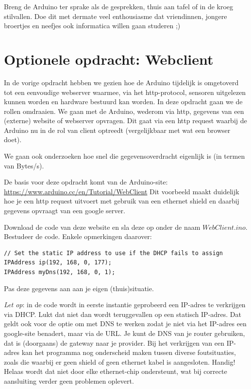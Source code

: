 \begin{exercise}
Breng de Arduino ter sprake als de gesprekken, thuis aan tafel of in de kroeg stilvallen. Doe dit met dermate veel enthousiasme dat vriendinnen, jongere broertjes en neefjes ook informatica willen gaan studeren ;)
\end{exercise}

\newpage

\section{Optionele opdracht: Webclient}
In de vorige opdracht hebben we gezien hoe de Arduino tijdelijk is omgetoverd tot een eenvoudige webserver waarmee, via het http-protocol, sensoren uitgelezen kunnen worden en hardware bestuurd kan worden. In deze opdracht gaan we de rollen omdraaien. We gaan met de Arduino, wederom via http, gegevens van een (externe) website of webserver opvragen. Dit gaat via een http request waarbij de Arduino nu in de rol van client optreedt (vergelijkbaar met wat een browser doet). \par 
We gaan ook onderzoeken hoe snel die gegevensoverdracht eigenlijk is (in termen van Bytes/s). \newline \newline

De basis voor deze opdracht komt van de Arduino-site: \newline
\url{https://www.arduino.cc/en/Tutorial/WebClient} \newline
Dit voorbeeld maakt duidelijk hoe je een http request uitvoert met gebruik van een ethernet shield en daarbij gegevens opvraagt van een google server. \newline \newline

\begin{exercise}
Download de code van deze website en sla deze op onder de naam $WebClient.ino$. Bestudeer de code. Enkele opmerkingen daarover:
\begin{lstlisting}[language=Arduino, numbers=none]
// Set the static IP address to use if the DHCP fails to assign
IPAddress ip(192, 168, 0, 177);
IPAddress myDns(192, 168, 0, 1);
\end{lstlisting}

Pas deze gegevens aan aan je eigen (thuis)situatie.
\end{exercise}

\begin{remark}\textit{Let op}: in de code wordt in eerste instantie geprobeerd een IP-adres te verkrijgen via DHCP. Lukt dat niet dan wordt teruggevallen op een statisch IP-adres. Dat geldt ook voor de optie om met DNS te werken zodat je niet via het IP-adres een google-site benadert, maar via de URL. Je kunt de DNS van je router gebruiken, dat is (doorgaans) de gateway naar je provider. Bij het verkrijgen van een IP-adres kan het programma nog onderscheid maken tussen diverse foutsituaties, zoals die waarbij er geen shield of geen ethernet kabel is aangesloten. Handig! Helaas wordt dat niet door elke ethernet-chip ondersteunt, wat bij correcte aansluiting verder geen problemen oplevert.
\end{remark}

